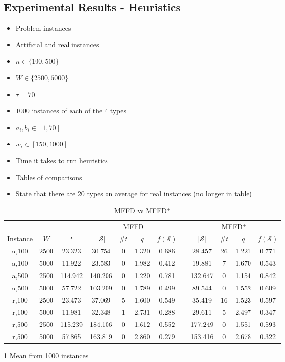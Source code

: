 \documentclass{elsarticle}
\begin{document}
\subsection{Experimental Results - Heuristics}
\begin{itemize}
	\item Problem instances
	\item Artificial and real instances
	\item $n \in \{100,500\}$
	\item $W \in \{2500,5000\}$
	\item $\tau = 70$
	\item 1000 instances of each of the 4 types
	\item $a_i, b_i \in [1,70]$
	\item $w_i \in [150,1000]$
	\item Time it takes to run heuristics
	\item Tables of comparisons
	\item State that there are 20 types on average for real instances (no longer in table)
\end{itemize}

\begin{table}[h!]
	\centering
\caption{MFFD vs MFFD$^+$}
\begin{threeparttable}
\begin{tabular}{cccccccccccc}\toprule
	& & & \multicolumn{4}{c}{MFFD} &\phantom{a}& \multicolumn{4}{c}{MFFD$^+$}\\
	\cmidrule{4-7} \cmidrule{9-12}
	Instance & $W$ & $t$ & $|\mathcal{S}|$\tnote{1} & $\# t$ & $q$ & $f(\mathcal{S})$ && $|\mathcal{S}|$ & $\# t$ & $q$ & $f(\mathcal{S})$\\ \midrule	
	a,100 & 2500 & 23.323 & 30.754 & 0 & 1.320 & 0.686 && 28.457 & 26 & 1.221 & 0.771 \\
	a,100 & 5000 & 11.922 & 23.583 & 0 & 1.982 & 0.412 && 19.881 & 7 & 1.670 & 0.543  \\
	\midrule
	a,500 & 2500 & 114.942 & 140.206 & 0 & 1.220 & 0.781 && 132.647 & 0 & 1.154 & 0.842 \\
	a,500 & 5000 & 57.722 & 103.209 & 0 & 1.789 & 0.499 && 89.544 & 0 & 1.552 & 0.609 \\
	\midrule
	\midrule
	r,100 & 2500 & 23.473 & 37.069 & 5 & 1.600 & 0.549 && 35.419 & 16 & 1.523 & 0.597 \\
	r,100 & 5000 & 11.981 & 32.348 & 1 & 2.731 & 0.288 && 29.611 & 5 & 2.497 & 0.347 \\
	\midrule
	r,500 & 2500 & 115.239 & 184.106 & 0 & 1.612 & 0.552 && 177.249 & 0 & 1.551 & 0.593 \\
	r,500 & 5000 & 57.865 & 163.819 & 0 & 2.860 & 0.279 && 153.416 & 0 & 2.678 & 0.322 \\
	\bottomrule
\end{tabular}
\begin{tablenotes}
	\item[1] Mean from 1000 instances
\end{tablenotes}	
\end{threeparttable}	
\label{table:MFFD}
\end{table}
\end{document}
